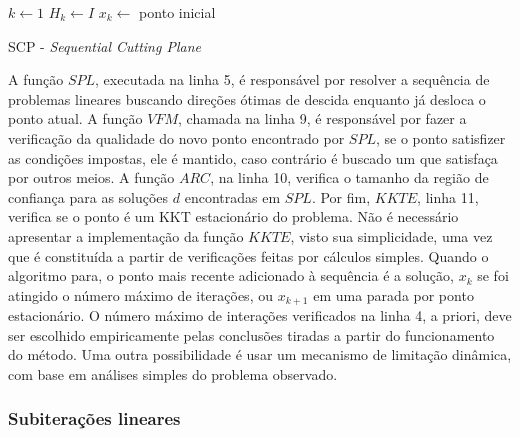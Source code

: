 \begin{algorithm}[H]
  \label{scp_algo}
  \SetAlgoLined
  \( k \gets 1 \)\;
  \( H_k \gets I \)\;
  \( x_k \gets \) ponto inicial\;
  
  \caption{SCP - \textit{Sequential Cutting Plane}}
\end{algorithm}
\vspace{15pt}

A função \(SPL\), executada na linha 5, é responsável por resolver a sequência de problemas lineares
buscando direções ótimas de descida enquanto já desloca o ponto atual. A função
\(VFM\), chamada na linha 9, é responsável por fazer a verificação da qualidade do novo ponto encontrado
por \(SPL\), se o ponto satisfizer as condições impostas, ele é mantido, caso contrário
é buscado um que satisfaça por outros meios. A função \(ARC\), na linha 10, verifica o tamanho da região
de confiança para as soluções \(d\) encontradas em \(SPL\). Por fim, \(KKTE\), linha 11, verifica
se o ponto é um KKT estacionário do problema. Não é necessário apresentar a implementação da função \(KKTE\),
visto sua simplicidade, uma vez que é constituída a partir de verificações feitas por cálculos simples.
Quando o algoritmo para, o ponto mais recente adicionado à sequência é a solução, \(x_k\) se foi atingido
o número máximo de iterações, ou \(x_{k+1}\) em uma parada por ponto
estacionário. O número máximo de interações verificados na linha 4, a priori,
deve ser escolhido empiricamente pelas conclusões tiradas a partir do funcionamento
do método. Uma outra possibilidade é usar um mecanismo de limitação dinâmica, com base
em análises simples do problema observado.

\subsubsection{Subiterações lineares}

